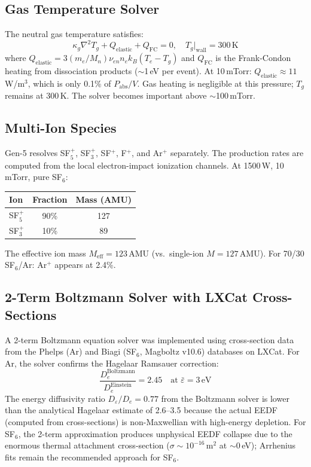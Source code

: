 \documentclass[11pt,a4paper]{article}
\renewcommand{\ne}{n_e}
\newcommand{\Te}{T_e}
\newcommand{\eV}{\,\mathrm{eV}}
\begin{document}
\subsection{Gas Temperature Solver}

The neutral gas temperature satisfies:
\begin{equation}
\kappa_g\nabla^2 T_g + Q_{\mathrm{elastic}} + Q_{\mathrm{FC}} = 0, \quad T_g\big|_{\mathrm{wall}} = 300\,\mathrm{K}
\end{equation}
where $Q_{\mathrm{elastic}} = 3(m_e/M_n)\nu_{en}\ne k_B(\Te - T_g)$ and $Q_{\mathrm{FC}}$ is the Frank-Condon heating from dissociation products ($\sim$1\,eV per event).  At 10\,mTorr: $Q_{\mathrm{elastic}} \approx 11$\,W/m$^3$, which is only 0.1\% of $P_{\mathrm{abs}}/V$.  Gas heating is negligible at this pressure; $T_g$ remains at 300\,K.  The solver becomes important above $\sim$100\,mTorr.

\subsection{Multi-Ion Species}

Gen-5 resolves SF$_5^+$, SF$_3^+$, SF$^+$, F$^+$, and Ar$^+$ separately.  The production rates are computed from the local electron-impact ionization channels.  At 1500\,W, 10\,mTorr, pure SF$_6$:
\begin{center}
\begin{tabular}{lcc}
\toprule
Ion & Fraction & Mass (AMU) \\
\midrule
SF$_5^+$ & 90\% & 127 \\
SF$_3^+$ & 10\% & 89 \\
\bottomrule
\end{tabular}
\end{center}
The effective ion mass $M_{\mathrm{eff}} = 123$\,AMU (vs.\ single-ion $M = 127$\,AMU).  For 70/30 SF$_6$/Ar: Ar$^+$ appears at 2.4\%.

\subsection{2-Term Boltzmann Solver with LXCat Cross-Sections}

A 2-term Boltzmann equation solver was implemented using cross-section data from the Phelps (Ar) and Biagi (SF$_6$, Magboltz v10.6) databases on LXCat.  For Ar, the solver confirms the Hagelaar Ramsauer correction:
\begin{equation}
\frac{D_e^{\mathrm{Boltzmann}}}{D_e^{\mathrm{Einstein}}} = 2.45 \quad \text{at } \bar{\varepsilon} = 3\eV
\end{equation}
The energy diffusivity ratio $D_\varepsilon/D_e = 0.77$ from the Boltzmann solver is lower than the analytical Hagelaar estimate of 2.6--3.5 because the actual EEDF (computed from cross-sections) is non-Maxwellian with high-energy depletion.  For SF$_6$, the 2-term approximation produces unphysical EEDF collapse due to the enormous thermal attachment cross-section ($\sigma \sim 10^{-16}$\,m$^2$ at $\sim$0\,eV); Arrhenius fits remain the recommended approach for SF$_6$.
\end{document}
